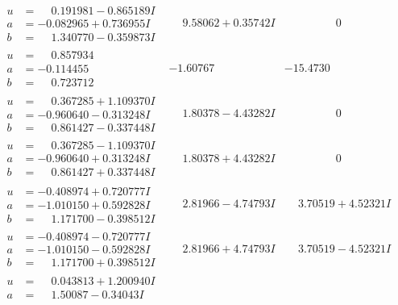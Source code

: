 \documentclass[1p]{elsarticle_modified}
\theoremstyle{definition}
\begin{document}
$$\begin{array}{c|c|c}
\begin{aligned}
u &= \phantom{-}0.191981 - 0.865189 I \\
a &= -0.082965 + 0.736955 I \\
b &= \phantom{-}1.340770 - 0.359873 I\end{aligned}
 & \phantom{-}9.58062 + 0.35742 I & \phantom{-0.000000 } 0 \\ \hline\begin{aligned}
u &= \phantom{-}0.857934\phantom{ +0.000000I} \\
a &= -0.114455\phantom{ +0.000000I} \\
b &= \phantom{-}0.723712\phantom{ +0.000000I}\end{aligned}
 & -1.60767\phantom{ +0.000000I} & -15.4730\phantom{ +0.000000I} \\ \hline\begin{aligned}
u &= \phantom{-}0.367285 + 1.109370 I \\
a &= -0.960640 - 0.313248 I \\
b &= \phantom{-}0.861427 - 0.337448 I\end{aligned}
 & \phantom{-}1.80378 - 4.43282 I & \phantom{-0.000000 } 0 \\ \hline\begin{aligned}
u &= \phantom{-}0.367285 - 1.109370 I \\
a &= -0.960640 + 0.313248 I \\
b &= \phantom{-}0.861427 + 0.337448 I\end{aligned}
 & \phantom{-}1.80378 + 4.43282 I & \phantom{-0.000000 } 0 \\ \hline\begin{aligned}
u &= -0.408974 + 0.720777 I \\
a &= -1.010150 + 0.592828 I \\
b &= \phantom{-}1.171700 - 0.398512 I\end{aligned}
 & \phantom{-}2.81966 - 4.74793 I & \phantom{-}3.70519 + 4.52321 I \\ \hline\begin{aligned}
u &= -0.408974 - 0.720777 I \\
a &= -1.010150 - 0.592828 I \\
b &= \phantom{-}1.171700 + 0.398512 I\end{aligned}
 & \phantom{-}2.81966 + 4.74793 I & \phantom{-}3.70519 - 4.52321 I \\ \hline\begin{aligned}
u &= \phantom{-}0.043813 + 1.200940 I \\
a &= \phantom{-}1.50087 - 0.34043 I \\

\end{aligned}
\end{array}$$
\end{document}
